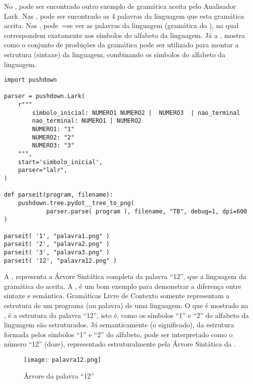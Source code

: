 No ,
pode ser encontrado outro exemplo de gramática aceita pelo Analisador Lark.
Nas ,
pode ser encontrado as 4 palavras da linguagem que esta gramática aceita.
Nas ,
pode~=se ver as palavras da linguagem (gramática do ),
na qual correspondem exatamente aos símbolos do alfabeto da linguagem.
Já a ,
mostra como o conjunto de produções da gramática pode ser utilizado para montar a estrutura (sintaxe) da linguagem,
combinando os símbolos do alfabeto da linguagem.
\begin{code}
\caption{Exemplo de gramática com uma Estrutura de Sintaxe}
\label{code:ExemploDeEstruturaDeGramaticaLark}
\begin{verbatim}
import pushdown

parser = pushdown.Lark(
    r"""
        simbolo_inicial: NUMERO1 NUMERO2 |  NUMERO3  | nao_terminal
        nao_terminal: NUMERO1 | NUMERO2
        NUMERO1: "1"
        NUMERO2: "2"
        NUMERO3: "3"
    """,
    start='simbolo_inicial',
    parser="lalr",
)

def parseit(program, filename):
    pushdown.tree.pydot__tree_to_png(
            parser.parse( program ), filename, "TB", debug=1, dpi=600 )

parseit( '1', "palavra1.png" )
parseit( '2', "palavra2.png" )
parseit( '3', "palavra3.png" )
parseit( '12', "palavra12.png" )
\end{verbatim}
\end{code}

A ,
representa a Árvore Sintática completa da palavra ``12'',
que a linguagem da gramática do  aceita.
A ,
é um bom exemplo para demonstrar a diferença entre sintaxe e
semântica.
Gramáticas Livre de Contexto somente representam a estrutura de um programa (ou palavra) de uma linguagem.
O que é mostrado na ,
é a estrutura da palavra ``12'',
isto é,
como os símbolos ``1'' e
``2'' do alfabeto da linguagem são estruturados.
Já semanticamente (o significado),
da estrutura formada pelos símbolos ``1'' e
``2'' do alfabeto,
pode ser interpretado como o número ``12'' (doze),
representado estruturalmente pela Árvore Sintática da .
\begin{figure}[H]
\caption{Árvore da palavra ``12''}
\label{Figure:palavra12}
\centering
\texttt{[image: palavra12.png]}
\end{figure}

